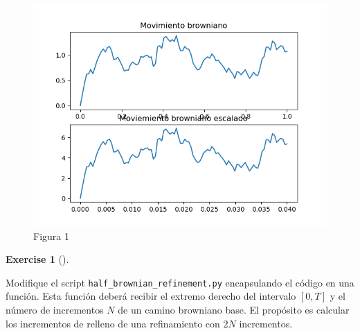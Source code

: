 \documentclass[
  letterpaper,
  DIV=11,
  numbers=noendperiod]{scrreprt}
\theoremstyle{plain}
\theoremstyle{definition}
\newtheorem{exercise}{Exercise}[chapter]
\theoremstyle{remark}
\begin{document}
\begin{figure}

{\centering \includegraphics{Figure_T4-1.png}

}

\caption{Figura 1}

\end{figure}

\begin{exercise}[]\protect\hypertarget{exr-3}{}\label{exr-3}

Modifique el script \texttt{half\_brownian\_refinement.py} encapsulando
el código en una función. Esta función deberá recibir el extremo derecho
del intervalo \([0, T]\) y el número de incrementos \(N\) de un camino
browniano base. El propósito es calcular los incrementos de relleno de
una refinamiento con \(2N\) incrementos.

\end{exercise}
\end{document}
